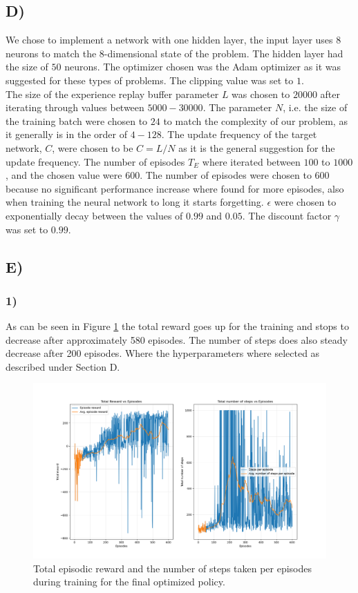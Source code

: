 \documentclass{article}
\begin{document}
\subsection*{D)}
We chose to implement a network with one hidden layer, the input layer uses $8$ neurons to match the 8-dimensional state of the problem. The hidden layer had the size of $50$ neurons. The optimizer chosen was the Adam optimizer as it was suggested for these types of problems. The clipping value was set to $1$.\\
\noindent The size of the experience replay buffer parameter $L$ was chosen to $20000$ after iterating through values between $5000 - 30000$. The parameter $N$, i.e. the size of the training batch were chosen to $24$ to match the complexity of our problem, as it generally is in the order of $4 - 128$.
The update frequency of the target network, $C$, were chosen to be $C = L/N$ as it is the general suggestion for the update frequency. The number of episodes $T_E$ where iterated between $100$ to $1000$, and the chosen value were $600$. The number of episodes were chosen to $600$ because no significant performance increase where found for more episodes, also when training the neural network to long it starts forgetting. $\epsilon$ were chosen to exponentially decay between the values of $0.99$ and $0.05$. The discount factor $\gamma$ was set to $0.99$. 

\subsection*{E)}
\subsubsection*{1)}
As can be seen in Figure \ref{fig:Policy} the total reward goes up for the training and stops to decrease after approximately 580 episodes. The number of steps does also steady decrease after 200 episodes. Where the hyperparameters where selected as described under Section D.
\begin{figure}[H]
    \centering
    \includegraphics[width=1\textwidth]{Lab_2/problem1/images/main_network.png}
    \caption{\small Total episodic reward and the number of steps taken per episodes during training for the final optimized policy. }
    \label{fig:Policy}
\end{figure}
\end{document}
